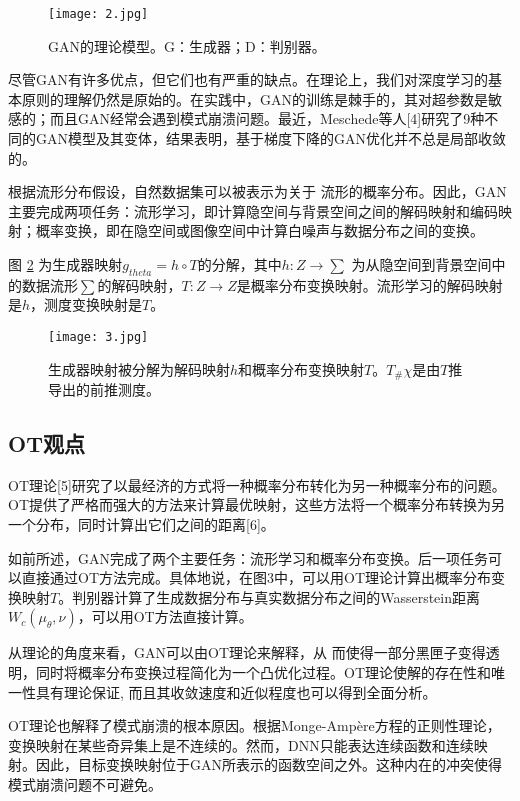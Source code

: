 \begin{figure}[h]
	\centering
	\texttt{[image: 2.jpg]}
	\caption{GAN的理论模型。G：生成器；D：判别器。}
	\label{fig:2}
\end{figure}

尽管GAN有许多优点，但它们也有严重的缺点。在理论上，我们对深度学习的基本原则的理解仍然是原始的。在实践中，GAN的训练是棘手的，其对超参数是敏感的；而且GAN经常会遇到模式崩溃问题。最近，Meschede等人[4]研究了9种不同的GAN模型及其变体，结果表明，基于梯度下降的GAN优化并不总是局部收敛的。

根据流形分布假设，自然数据集可以被表示为关于
流形的概率分布。因此，GAN主要完成两项任务：流形学习，即计算隐空间与背景空间之间的解码映射和编码映射；概率变换，即在隐空间或图像空间中计算白噪声与数据分布之间的变换。

图 \ref{fig:3} 为生成器映射$g_{theta}=ℎ \circ T$的分解，其中$h: Z \to \sum$ 为从隐空间到背景空间中的数据流形$\sum$的解码映射，$T: Z\to Z$是概率分布变换映射。流形学习的解码映射是$h$，测度变换映射是$T$。

\begin{figure}[h]
	\centering
	\texttt{[image: 3.jpg]}
	\caption{生成器映射被分解为解码映射$h$和概率分布变换映射$T$。$T_{\#}\chi$是由$T$推导出的前推测度。
	}
	\label{fig:3}
\end{figure}

\subsection{OT观点}

OT理论[5]研究了以最经济的方式将一种概率分布转化为另一种概率分布的问题。OT提供了严格而强大的方法来计算最优映射，这些方法将一个概率分布转换为另一个分布，同时计算出它们之间的距离[6]。

如前所述，GAN完成了两个主要任务：流形学习和概率分布变换。后一项任务可以直接通过OT方法完成。具体地说，在图3中，可以用OT理论计算出概率分布变换映射$T$。判别器计算了生成数据分布与真实数据分布之间的Wasserstein距离$W_c(\mu_{\theta},\nu)$，可以用OT方法直接计算。

从理论的角度来看，GAN可以由OT理论来解释，从
而使得一部分黑匣子变得透明，同时将概率分布变换过程简化为一个凸优化过程。OT理论使解的存在性和唯一性具有理论保证, 而且其收敛速度和近似程度也可以得到全面分析。

OT理论也解释了模式崩溃的根本原因。根据Monge-Ampère方程的正则性理论，变换映射在某些奇异集上是不连续的。然而，DNN只能表达连续函数和连续映射。因此，目标变换映射位于GAN所表示的函数空间之外。这种内在的冲突使得模式崩溃问题不可避免。

